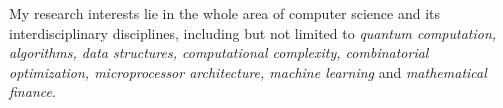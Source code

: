 
My research interests lie in the whole area of computer science
and its interdisciplinary disciplines,
including but not limited to
\textit{quantum computation,
algorithms, data structures,
computational complexity, combinatorial optimization,
microprocessor architecture,
machine learning}
and
\textit{mathematical finance}.

\endinput
